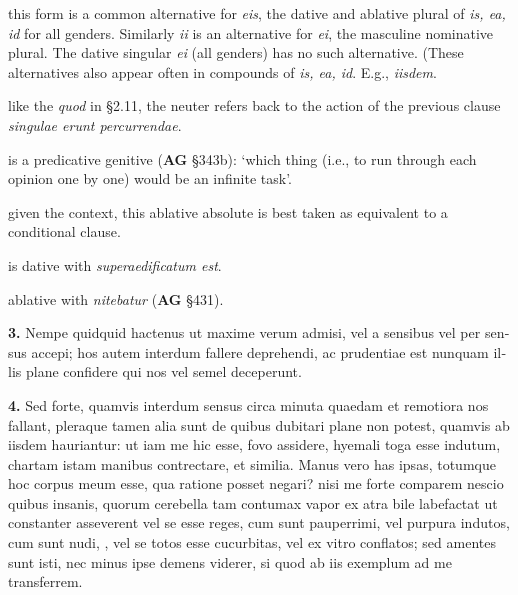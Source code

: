  this form is a common alternative for \textit{eis}, the dative and ablative plural of \textit{is, ea, id} for all genders. Similarly \textit{ii} is an alternative for \textit{ei}, the masculine nominative plural. The dative singular \textit{ei} (all genders) has no such alternative. (These alternatives also appear often in compounds of \textit{is, ea, id}. E.g., \textit{iisdem}.

 like the \textit{quod} in §2.11, the neuter refers back to the action of the previous clause \textit{singulae erunt percurrendae}.

 is a predicative genitive (\textbf{AG} §343b): `which thing (i.e., to run through each opinion one by one) would be an infinite task'.

 given the context, this ablative absolute is best taken as equivalent to a conditional clause.

 is dative with \textit{superaedificatum est}.

 ablative with \textit{nitebatur} (\textbf{AG} §431).


\clearpage

\beginnumbering
\pstart
\begin{latin}
    \textenglish{\textbf{3.}} Nempe quidquid hactenus ut maxime verum admisi, vel a sensibus vel per sensus accepi; hos autem interdum fallere deprehendi, ac prudentiae est nunquam illis plane confidere qui nos vel semel deceperunt.
\end{latin}
\pend
\endnumbering

\beginnumbering
\pstart
\begin{latin}
    \textenglish{\textbf{4.}} Sed forte, quamvis interdum sensus circa minuta quaedam et remotiora nos fallant, pleraque tamen alia sunt de quibus dubitari plane non potest, quamvis ab iisdem hauriantur: ut iam me hic esse, fovo assidere, hyemali toga esse indutum, chartam istam manibus contrectare, et similia. Manus vero has ipsas, totumque hoc corpus meum esse, qua ratione posset negari? nisi me forte comparem nescio quibus insanis, quorum cerebella tam contumax vapor ex atra bile labefactat ut constanter asseverent vel se esse reges, cum sunt pauperrimi, vel purpura indutos, cum sunt nudi, , vel se totos esse cucurbitas, vel ex vitro conflatos; sed amentes sunt isti, nec minus ipse demens viderer, si quod ab iis exemplum ad me transferrem.
\end{latin}
\pend
\endnumbering

